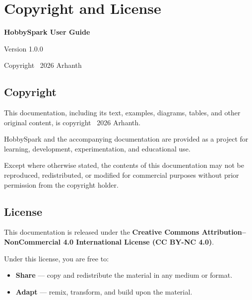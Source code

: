 \documentclass[11pt]{book}
\begin{document}
	\chapter*{Copyright and License}

\vspace*{1cm}

\begin{center}
    {\Large\bfseries HobbySpark User Guide}

    \vspace{0.4cm}

    {\large Version 1.0.0}

    \vspace{0.8cm}

    {\large Copyright \textcopyright\ 2026 Arhanth}

    \vspace{1cm}
\end{center}

\section*{Copyright}

This documentation, including its text, examples, diagrams, tables, and
other original content, is copyright \textcopyright\ 2026 Arhanth.

HobbySpark and the accompanying documentation are provided as a project
for learning, development, experimentation, and educational use.

Except where otherwise stated, the contents of this documentation may not
be reproduced, redistributed, or modified for commercial purposes without
prior permission from the copyright holder.

\vspace{0.5cm}

\section*{License}

This documentation is released under the
\textbf{Creative Commons Attribution--NonCommercial 4.0 International
License (CC BY-NC 4.0)}.

Under this license, you are free to:

\begin{itemize}
    \item \textbf{Share} --- copy and redistribute the material in any
    medium or format.
    
    \item \textbf{Adapt} --- remix, transform, and build upon the material.
\end{itemize}
\end{document}
